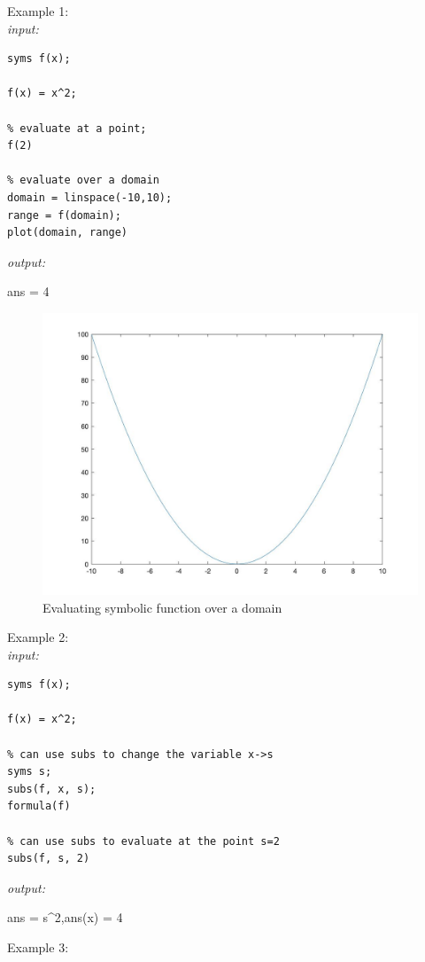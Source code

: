 \documentclass[../MATLAB_Primer.tex]{subfiles}
\begin{document}
Example 1:\\

\textit{input:}
\begin{lstlisting}
syms f(x);

f(x) = x^2;

% evaluate at a point;
f(2)

% evaluate over a domain
domain = linspace(-10,10);
range = f(domain);
plot(domain, range)
\end{lstlisting}
\textit{output:}
\begin{center}
    ans = 4
\end{center}
\begin{figure}[H]
    \centering
    \includegraphics[width=350pt]{images/sym_parabola.jpg}
    \caption{Evaluating symbolic function over a domain}
    \label{fig:sym_plot}
\end{figure}

Example 2:\\

\textit{input:}
\begin{lstlisting}
syms f(x);

f(x) = x^2;

% can use subs to change the variable x->s 
syms s;
subs(f, x, s);
formula(f)

% can use subs to evaluate at the point s=2
subs(f, s, 2)

\end{lstlisting}
\textit{output:}
\begin{center}
    ans = s\^{}2,\quad ans(x) = 4
\end{center}


Example 3:\\
\end{document}
